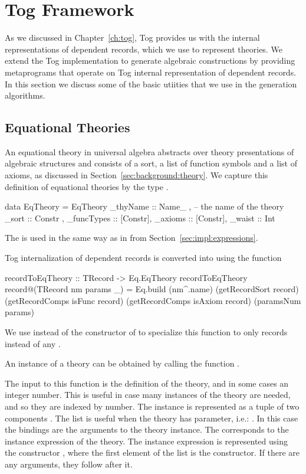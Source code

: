 \section{Tog Framework}
\label{sec:togFamework}

As we discussed in Chapter~\ref{ch:tog}, Tog provides us with the internal representations of dependent records, which we use to represent theories. We extend the Tog implementation to generate algebraic constructions by providing metaprograms that operate on Tog internal representation of dependent records. In this section we discuss some of the basic utiities that we use in the generation algorithms. 

\subsection{Equational Theories}
An equational theory in universal algebra abstracts over theory presentations of algebraic structures and consists of a sort, a list of function symbols and a list of axioms, as discussed in Section~\ref{sec:background:theory}. We capture this definition of equational theories by the type . 
\begin{hscode}
data EqTheory = EqTheory {
  _thyName   :: Name_  ,   -- the name of the theory 
  _sort       :: Constr ,      
  _funcTypes  :: [Constr],
  _axioms     :: [Constr],
  _waist      :: Int }
\end{hscode}
The  is used in the same way as in  from Section~\ref{sec:impl:expressions}. 

Tog internalization of dependent records is converted into  using the function 
\begin{hscode}
recordToEqTheory :: TRecord -> Eq.EqTheory
recordToEqTheory record@(TRecord nm params _) =
  Eq.build (nm^.name) 
    (getRecordSort record)
    (getRecordComps isFunc record)
    (getRecordComps isAxiom record)
    (paramsNum params)
\end{hscode}
We use  instead of the  constructor of  to specialize this function to only records instead of any .

An instance of a theory can be obtained by calling the function . 

The input to this function is the definition of the theory, and in some cases an integer number. This is useful in case many instances of the theory are needed, and so they are indexed by number. The instance is represented as a tuple of two components . The  list is useful when the theory has parameter, i.e.: . In this case the  bindings are the arguments to the theory instance. The  corresponds to the instance expression of the theory. The instance expression is represented using the constructor , where the first element of the list is the constructor. If there are any arguments, they follow after it. 

